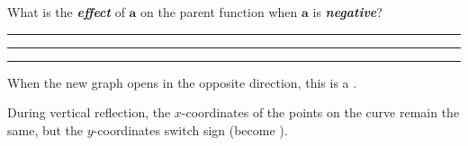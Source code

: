 What is the {\bfseries\itshape effect} of $\bm{a}$ on the parent function
when $\bm{a}$ is {\bfseries\itshape negative}?

\rule{\textwidth}{0.15mm}

\rule{\textwidth}{0.15mm}

\rule{\textwidth}{0.15mm}









\vspace{\baselineskip}

When the new graph opens in the opposite direction,
this is a  . 

During vertical reflection, 
the $x$-coordinates of the points on the curve remain the same, 
but the $y$-coordinates switch sign (become ).
